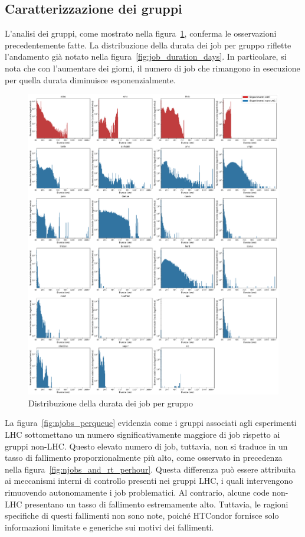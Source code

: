 \subsection{Caratterizzazione dei gruppi}

L'analisi dei gruppi, come mostrato nella
figura~\ref{fig:job_duration_perqueue}, conferma le osservazioni
precedentemente fatte. La distribuzione della durata dei job per gruppo
riflette l'andamento già notato nella figura~\ref{fig:job_duration_days}. In
particolare, si nota che con l'aumentare dei giorni, il numero di job che
rimangono in esecuzione per quella durata diminuisce esponenzialmente.

\begin{figure}[!p]
    \centering
    \includegraphics[width=\textwidth]{images/job_duration_perqueue}
    \caption{Distribuzione della durata dei job per gruppo}
    \label{fig:job_duration_perqueue}
\end{figure}

La figura~\ref{fig:njobs_perqueue} evidenzia come i gruppi associati agli
esperimenti LHC sottomettano un numero significativamente maggiore di job
rispetto ai gruppi non-LHC. Questo elevato numero di job, tuttavia, non si
traduce in un tasso di fallimento proporzionalmente più alto, come osservato
in precedenza nella figura~\ref{fig:njobs_and_rt_perhour}. Questa differenza
può essere attribuita ai meccanismi interni di controllo presenti nei gruppi
LHC, i quali intervengono rimuovendo autonomamente i job problematici. Al
contrario, alcune code non-LHC presentano un tasso di fallimento estremamente
alto. Tuttavia, le ragioni specifiche di questi fallimenti non sono note,
poiché HTCondor fornisce solo informazioni limitate e generiche sui motivi dei
fallimenti.


